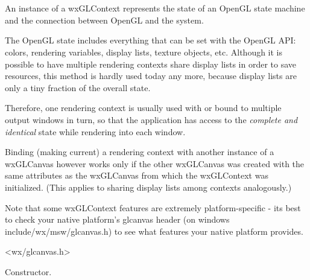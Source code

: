 \section{}\label{wxglcontext}

An instance of a wxGLContext represents the state of an OpenGL state machine and the connection between OpenGL and the system.

The OpenGL state includes everything that can be set with the OpenGL API: colors, rendering variables, display lists, texture objects, etc.
Although it is possible to have multiple rendering contexts share display lists in order to save resources,
this method is hardly used today any more, because display lists are only a tiny fraction of the overall state.

Therefore, one rendering context is usually used with or bound to multiple output windows in turn,
so that the application has access to the \emph{complete and identical} state while rendering into each window.

Binding (making current) a rendering context with another instance of a wxGLCanvas however works only
if the other wxGLCanvas was created with the same attributes as the wxGLCanvas from which the wxGLContext
was initialized. (This applies to sharing display lists among contexts analogously.)

Note that some wxGLContext features are extremely platform-specific - its best to check your native platform's glcanvas header (on windows include/wx/msw/glcanvas.h) to see what features your native platform provides.






<wx/glcanvas.h>





\label{wxglcontextconstr}


Constructor.


